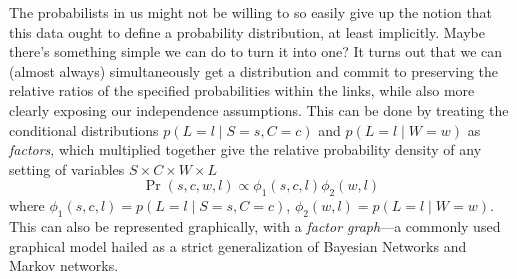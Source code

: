 \documentclass{article}
\newcommand\changed[1]{{\color{note-fg} #1}}
\begin{document}
	\begin{example}[continues=ex:planet]
		The probabilists in us might not be willing to so easily give up the notion that this data ought to define a probability distribution, at least implicitly. 
		Maybe there's something simple we can do to turn it into one? It turns out that we can (almost always) \changed{simultaneously get a distribution and commit to preserving the relative ratios of the specified probabilities within the links, while also more clearly exposing our independence assumptions. 		
		This can be done by} treating the conditional distributions $p(L =l \mid S=s, C=c)$ and $p(L=l \mid W=w)$ as \emph{factors}, which multiplied together give the relative probability density of any setting of variables $S \times C \times W \times L$
		\[ \Pr(s, c, w, l) \propto \phi_1(s,c,l) \phi_2(w,l) \]
		where $\phi_1(s,c,l) = p(L=l \mid S=s, C=c)$, $\phi_2(w,l) = p(L=l\mid W=w)$. This can also be represented graphically, with a \emph{factor graph}---a commonly used graphical model hailed as a strict generalization of Bayesian Networks and Markov networks.
		
		\begin{center}
\end{center}
\end{example}
\end{document}
